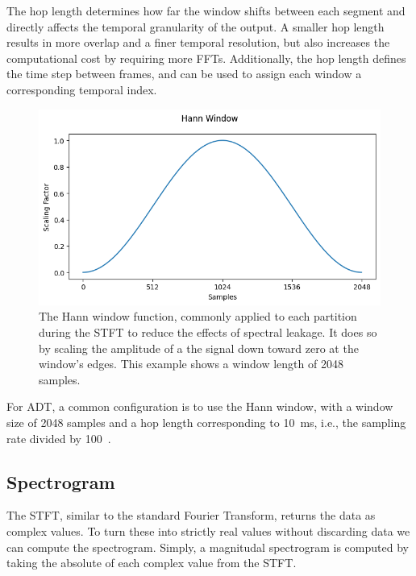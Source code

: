 The hop length determines how far the window shifts between each segment and directly affects the temporal granularity of the output. A smaller hop length results in more overlap and a finer temporal resolution, but also increases the computational cost by requiring more \glspl{FFT}. Additionally, the hop length defines the time step between frames, and can be used to assign each window a corresponding temporal index.

\begin{figure}[H]
    \centering
    \includegraphics[scale=0.8]{figures/hann}
    \caption{The Hann window function, commonly applied to each partition during the \gls{STFT} to reduce the effects of spectral leakage. It does so by scaling the amplitude of a the signal down toward zero at the window's edges. This example shows a window length of 2048 samples.}
    \label{HannWindowFigure}
\end{figure}

For \gls{ADT}, a common configuration is to use the Hann window, with a window size of 2048 samples and a hop length corresponding to 10~ms, i.e., the sampling rate divided by 100~\cite{8350302, vogl2016recurrent,vogl2018multiinstrumentdrumtranscription, signals4040042}.

\subsection{Spectrogram}

The \gls{STFT}, similar to the standard Fourier Transform, returns the data as complex values. To turn these into strictly real values without discarding data we can compute the spectrogram. Simply, a magnitudal spectrogram is computed by taking the absolute of each complex value from the \gls{STFT}.

